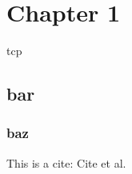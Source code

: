 \chapter{Chapter 1}

\Ac{tcp}

\section{bar}
\subsection{baz}

This is a cite: Cite et al.%

\Blindtext
